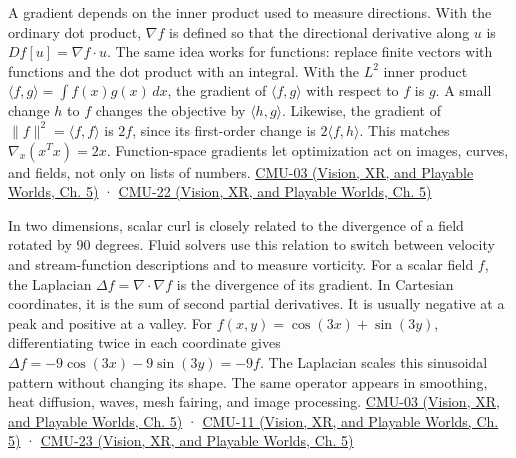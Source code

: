 \hypertarget{03-visual-computing-i-ch001-coordinate-free-products-and-the-meaning-of-second-derivatives}{}

A gradient depends on the inner product used to measure directions. With the ordinary dot product, \(\nabla f\) is defined so that the directional derivative along \(u\) is \(Df[u]=\nabla f\cdot u\). The same idea works for functions: replace finite vectors with functions and the dot product with an integral. With the \(L^2\) inner product \(\langle f,g\rangle=\int f(x)g(x)\,dx\), the gradient of \(\langle f,g\rangle\) with respect to \(f\) is \(g\). A small change \(h\) to \(f\) changes the objective by \(\langle h,g\rangle\). Likewise, the gradient of \(\|f\|^2=\langle f,f\rangle\) is \(2f\), since its first-order change is \(2\langle f,h\rangle\). This matches \(\nabla_x(x^Tx)=2x\). Function-space gradients let optimization act on images, curves, and fields, not only on lists of numbers. \href{../07-Vision-XR-and-Playable-Worlds/main.pdf\#nameddest=04-visual-computing-ii-ch036-cmu-03---vector-calculus-preview}{CMU-03 (Vision, XR, and Playable Worlds, Ch. 5)} · \href{../07-Vision-XR-and-Playable-Worlds/main.pdf\#nameddest=04-visual-computing-ii-ch036-cmu-22---optimization}{CMU-22 (Vision, XR, and Playable Worlds, Ch. 5)}

In two dimensions, scalar curl is closely related to the divergence of a field rotated by 90 degrees. Fluid solvers use this relation to switch between velocity and stream-function descriptions and to measure vorticity. For a scalar field \(f\), the Laplacian \(\Delta f=\nabla\cdot\nabla f\) is the divergence of its gradient. In Cartesian coordinates, it is the sum of second partial derivatives. It is usually negative at a peak and positive at a valley. For \(f(x,y)=\cos(3x)+\sin(3y)\), differentiating twice in each coordinate gives \(\Delta f=-9\cos(3x)-9\sin(3y)=-9f\). The Laplacian scales this sinusoidal pattern without changing its shape. The same operator appears in smoothing, heat diffusion, waves, mesh fairing, and image processing. \href{../07-Vision-XR-and-Playable-Worlds/main.pdf\#nameddest=04-visual-computing-ii-ch036-cmu-03---vector-calculus-preview}{CMU-03 (Vision, XR, and Playable Worlds, Ch. 5)} · \href{../07-Vision-XR-and-Playable-Worlds/main.pdf\#nameddest=04-visual-computing-ii-ch036-cmu-11---digital-geometry-processing}{CMU-11 (Vision, XR, and Playable Worlds, Ch. 5)} · \href{../07-Vision-XR-and-Playable-Worlds/main.pdf\#nameddest=04-visual-computing-ii-ch036-cmu-23---physically-based-animation-and-pdes}{CMU-23 (Vision, XR, and Playable Worlds, Ch. 5)}


